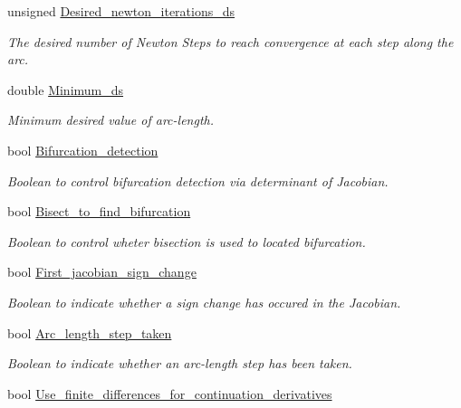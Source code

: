 \begin{DoxyCompactItemize}
unsigned \hyperlink{classoomph_1_1Problem_abfe8db162a0bda98add0062a45f41cbf}{Desired\+\_\+newton\+\_\+iterations\+\_\+ds}
\begin{DoxyCompactList}\small\item\em The desired number of Newton Steps to reach convergence at each step along the arc. \end{DoxyCompactList}\item 
double \hyperlink{classoomph_1_1Problem_ad0f8bb126a4f5ddeb559c23a8d451d8d}{Minimum\+\_\+ds}
\begin{DoxyCompactList}\small\item\em Minimum desired value of arc-\/length. \end{DoxyCompactList}\item 
bool \hyperlink{classoomph_1_1Problem_a08dfc704030bb65cea3d9784c5271af0}{Bifurcation\+\_\+detection}
\begin{DoxyCompactList}\small\item\em Boolean to control bifurcation detection via determinant of Jacobian. \end{DoxyCompactList}\item 
bool \hyperlink{classoomph_1_1Problem_ab805e5e5fb94f941cc7ff1b850d83269}{Bisect\+\_\+to\+\_\+find\+\_\+bifurcation}
\begin{DoxyCompactList}\small\item\em Boolean to control wheter bisection is used to located bifurcation. \end{DoxyCompactList}\item 
bool \hyperlink{classoomph_1_1Problem_a643f61299463a3bbf7be3f6a112aa130}{First\+\_\+jacobian\+\_\+sign\+\_\+change}
\begin{DoxyCompactList}\small\item\em Boolean to indicate whether a sign change has occured in the Jacobian. \end{DoxyCompactList}\item 
bool \hyperlink{classoomph_1_1Problem_a8109bf56e9203d248ae30a50bb9cfe90}{Arc\+\_\+length\+\_\+step\+\_\+taken}
\begin{DoxyCompactList}\small\item\em Boolean to indicate whether an arc-\/length step has been taken. \end{DoxyCompactList}\item 
bool \hyperlink{classoomph_1_1Problem_a80dac9f70c77302805bb782cc6f1ad0f}{Use\+\_\+finite\+\_\+differences\+\_\+for\+\_\+continuation\+\_\+derivatives}
\item 

\end{DoxyCompactItemize}
